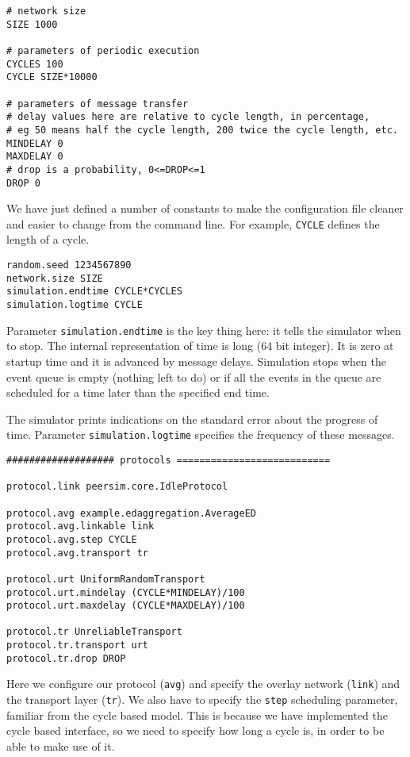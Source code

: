 \documentclass[a4paper,11pt]{article}
\begin{document}
\footnotesize
\begin{verbatim}
# network size
SIZE 1000

# parameters of periodic execution
CYCLES 100
CYCLE SIZE*10000

# parameters of message transfer
# delay values here are relative to cycle length, in percentage,
# eg 50 means half the cycle length, 200 twice the cycle length, etc.
MINDELAY 0
MAXDELAY 0
# drop is a probability, 0<=DROP<=1
DROP 0
\end{verbatim}
\normalsize

We have just defined a number of constants to make the configuration file
cleaner and easier to change from the command line.
For example, \texttt{CYCLE} defines the length of a cycle.

\footnotesize
\begin{verbatim}
random.seed 1234567890
network.size SIZE
simulation.endtime CYCLE*CYCLES
simulation.logtime CYCLE
\end{verbatim}
\normalsize

Parameter \texttt{simulation.endtime} is the key thing here: it tells the
simulator when to stop.
The internal representation of time is long (64 bit integer).
It is zero at startup time and it is advanced by message delays.
Simulation stops when the event queue is empty (nothing left to do) or
if all the events in the queue are scheduled for a time later than the
specified end time.

The simulator prints indications on the standard error about the
progress of time.
Parameter \texttt{simulation.logtime} specifies the frequency of these
messages.

\footnotesize
\begin{verbatim}
################### protocols ===========================

protocol.link peersim.core.IdleProtocol

protocol.avg example.edaggregation.AverageED
protocol.avg.linkable link
protocol.avg.step CYCLE
protocol.avg.transport tr

protocol.urt UniformRandomTransport
protocol.urt.mindelay (CYCLE*MINDELAY)/100
protocol.urt.maxdelay (CYCLE*MAXDELAY)/100

protocol.tr UnreliableTransport
protocol.tr.transport urt
protocol.tr.drop DROP
\end{verbatim}
\normalsize

Here we configure our protocol (\texttt{avg}) and specify the
overlay network (\texttt{link}) and the transport layer (\texttt{tr}).
We also have to specify the \texttt{step} scheduling parameter, familiar
from the cycle based model.
This is because we have implemented the cycle based interface, so we need
to specify how long a cycle is, in order to be able to make use of it.
\end{document}
